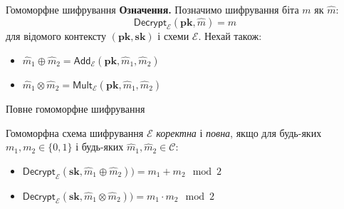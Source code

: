 \documentclass[pdf]{beamer}
\begin{document}
\begin{frame}{Гомоморфне шифрування}
\textbf{Означення.} Позначимо шифрування біта \( m \) як \( \hat m \):
\[ \mathsf{Decrypt}_\mathcal{E}( \mathbf{pk}, \hat m ) = m \]
для відомого контексту \( (\mathbf{pk}, \mathbf{sk}) \) і схеми \( \mathcal{E} \). Нехай також:

\begin{itemize}
\setlength{\itemindent}{10em}
\item[(Гомоморфне додавання)] \( \hat m_1 \oplus \hat m_2 = \mathsf{Add}_\mathcal{E}( \mathbf{pk}, \hat m_1, \hat m_2 )  \)
\item[(Гомоморфне множення)] \( \hat m_1 \otimes \hat m_2 = \mathsf{Mult}_\mathcal{E}( \mathbf{pk}, \hat m_1, \hat m_2 ) \)
\end{itemize}

\end{frame}


\begin{frame}{Повне гомоморфне шифрування}

\begin{block}{}
Гомоморфна схема шифрування \( \mathcal{E} \) \emph{коректна} і \emph{повна}, 
якщо для будь-яких \( m_1, m_2 \in \{ 0, 1\}\) і будь-яких \( \hat m_1, \hat m_2 \in \mathcal{C}\):

\begin{itemize}
	\item \( \mathsf{Decrypt}_\mathcal{E}( \mathbf{sk}, \hat m_1 \oplus \hat m_2 ) ) = m_1 + m_2 \mod 2 \)
	\item \( \mathsf{Decrypt}_\mathcal{E}( \mathbf{sk}, \hat m_1 \otimes \hat m_2 ) ) = m_1 \cdot m_2 \mod 2 \)
\end{itemize}
\end{block}

\end{frame}
\end{document}
